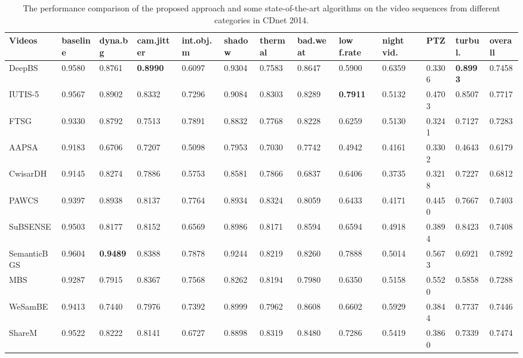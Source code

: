 \documentclass[runningheads,a4paper]{llncs}
\newcommand{\reftab}[1]{Table \ref{#1}}
\begin{document}
\begin{table}[tab1]
\centering
\caption{The performance comparison of the proposed approach and some state-of-the-art algorithms on the video sequences from different categories in CDnet 2014.}
\label{tab1_res}
\begin{tabular}{lllllllllllll}
\hline
Videos      & baseline & dyna.bg & cam.jitter & int.obj.m & shadow & thermal & bad.weat & low f.rate & night vid. & PTZ    & turbul. & overall \\ \hline
DeepBS      & 0.9580   & 0.8761  & \textbf{0.8990}     & 0.6097    & 0.9304 & 0.7583  & 0.8647   & 0.5900     & 0.6359     & 0.3306 & \textbf{0.8993}  & 0.7458  \\
IUTIS-5     & 0.9567   & 0.8902  & 0.8332     & 0.7296    & 0.9084 & 0.8303  & 0.8289   & \textbf{0.7911}     & 0.5132     & 0.4703 & 0.8507  & 0.7717  \\
FTSG        & 0.9330   & 0.8792  & 0.7513     & 0.7891    & 0.8832 & 0.7768  & 0.8228   & 0.6259     & 0.5130     & 0.3241 & 0.7127  & 0.7283  \\
AAPSA       & 0.9183   & 0.6706  & 0.7207     & 0.5098    & 0.7953 & 0.7030  & 0.7742   & 0.4942     & 0.4161     & 0.3302 & 0.4643  & 0.6179  \\
CwisarDH    & 0.9145   & 0.8274  & 0.7886     & 0.5753    & 0.8581 & 0.7866  & 0.6837   & 0.6406     & 0.3735     & 0.3218 & 0.7227  & 0.6812  \\
PAWCS       & 0.9397   & 0.8938  & 0.8137     & 0.7764    & 0.8934 & 0.8324  & 0.8059   & 0.6433     & 0.4171     & 0.4450 & 0.7667  & 0.7403  \\
SuBSENSE    & 0.9503   & 0.8177  & 0.8152     & 0.6569    & 0.8986 & 0.8171  & 0.8594   & 0.6594     & 0.4918     & 0.3894 & 0.8423  & 0.7408  \\
SemanticBGS & 0.9604   & \textbf{0.9489}  & 0.8388     & 0.7878    & 0.9244 & 0.8219  & 0.8260   & 0.7888     & 0.5014     & 0.5673 & 0.6921  & 0.7892  \\
MBS         & 0.9287   & 0.7915  & 0.8367     & 0.7568    & 0.8262 & 0.8194  & 0.7980   & 0.6350     & 0.5158     & 0.5520 & 0.5858  & 0.7288  \\
WeSamBE     & 0.9413   & 0.7440  & 0.7976     & 0.7392    & 0.8999 & 0.7962  & 0.8608   & 0.6602     & 0.5929     & 0.3844 & 0.7737  & 0.7446  \\
ShareM      & 0.9522   & 0.8222  & 0.8141     & 0.6727    & 0.8898 & 0.8319  & 0.8480   & 0.7286     & 0.5419     & 0.3860 & 0.7339  & 0.7474  \\

\end{tabular}
\end{table}
\end{document}
